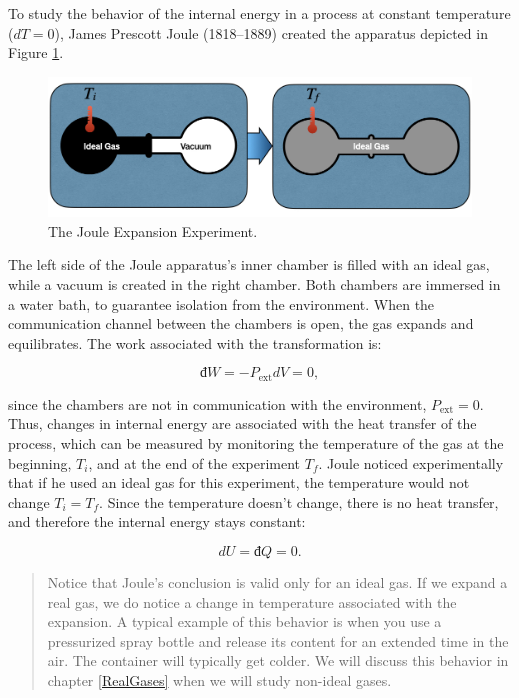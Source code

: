 \documentclass[
  9pt,
]{extbook}
\theoremstyle{definition}
\theoremstyle{definition}
\theoremstyle{definition}
\theoremstyle{definition}
\theoremstyle{remark}
\begin{document}
To study the behavior of the internal energy in a process at constant temperature (\(dT=0\)), James Prescott Joule (1818--1889) created the apparatus depicted in Figure \ref{fig:FigJexp}.

\begin{figure}

{\centering \includegraphics[width=0.8\linewidth]{./img/OEP_Figures.006} 

}

\caption{The Joule Expansion Experiment.}\label{fig:FigJexp}
\end{figure}

The left side of the Joule apparatus's inner chamber is filled with an ideal gas, while a vacuum is created in the right chamber. Both chambers are immersed in a water bath, to guarantee isolation from the environment. When the communication channel between the chambers is open, the gas expands and equilibrates. The work associated with the transformation is:

\begin{equation}
  đ W=-P_{\text{ext}}dV = 0,
  \label{eq:JexpW}
\end{equation}

since the chambers are not in communication with the environment, \(P_{\text{ext}}=0\). Thus, changes in internal energy are associated with the heat transfer of the process, which can be measured by monitoring the temperature of the gas at the beginning, \(T_i\), and at the end of the experiment \(T_f\). Joule noticed experimentally that if he used an ideal gas for this experiment, the temperature would not change \(T_i = T_f\). Since the temperature doesn't change, there is no heat transfer, and therefore the internal energy stays constant:

\begin{equation}
  dU = đ Q = 0.
  \label{eq:JexpQU}
\end{equation}

\begin{quote}
Notice that Joule's conclusion is valid only for an ideal gas. If we expand a real gas, we do notice a change in temperature associated with the expansion. A typical example of this behavior is when you use a pressurized spray bottle and release its content for an extended time in the air. The container will typically get colder. We will discuss this behavior in chapter \ref{RealGases} when we will study non-ideal gases.
\end{quote}
\end{document}
